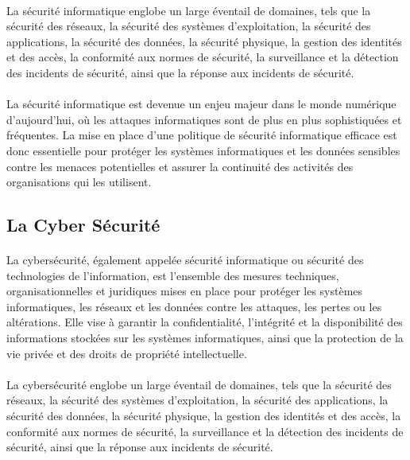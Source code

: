\documentclass{report}
\begin{document}
 \paragraph{ } La sécurité informatique englobe un large éventail de domaines, tels que la sécurité des réseaux, la sécurité des systèmes d'exploitation, la sécurité des applications, la sécurité des données, la sécurité physique, la gestion des identités et des accès, la conformité aux normes de sécurité, la surveillance et la détection des incidents de sécurité, ainsi que la réponse aux incidents de sécurité.
 
 \paragraph{ }  La sécurité informatique est devenue un enjeu majeur dans le monde numérique d’aujourd’hui, où les attaques informatiques sont de plus en plus sophistiquées et fréquentes. La mise en place d'une politique de sécurité informatique efficace est donc essentielle pour protéger les systèmes informatiques et les données sensibles contre les menaces potentielles et assurer la continuité des activités des organisations qui les utilisent.
 
  \subsection{ La Cyber Sécurité }
  \paragraph{ }
  La cybersécurité, également appelée sécurité informatique ou sécurité des technologies de l'information, est l'ensemble des mesures techniques, organisationnelles et juridiques mises en place pour protéger les systèmes informatiques, les réseaux et les données contre les attaques, les pertes ou les altérations. Elle vise à garantir la confidentialité, l'intégrité et la disponibilité des informations stockées sur les systèmes informatiques, ainsi que la protection de la vie privée et des droits de propriété intellectuelle.
  \paragraph{ }
  La cybersécurité englobe un large éventail de domaines, tels que la sécurité des réseaux, la sécurité des systèmes d'exploitation, la sécurité des applications, la sécurité des données, la sécurité physique, la gestion des identités et des accès, la conformité aux normes de sécurité, la surveillance et la détection des incidents de sécurité, ainsi que la réponse aux incidents de sécurité.
\end{document}

